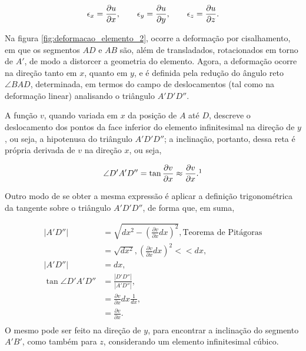 \begin{equation}
    \epsilon_x = \frac{\partial u}{\partial x}, \qquad \epsilon_y = \frac{\partial u}{\partial y}, \qquad \epsilon_z = \frac{\partial u}{\partial z}. \\
\end{equation}  

Na figura \ref{fig:deformacao_elemento_2}, ocorre a deformação por cisalhamento, em que os segmentos $AD$ e $AB$ são, além de transladados, rotacionados em torno de $A'$, de modo a distorcer a geometria do elemento. Agora, a deformação ocorre na direção tanto em $x$, quanto em $y$, e é definida pela redução do ângulo reto $\angle BAD$, determinada, em termos do campo de deslocamentos (tal como na deformação linear) analisando o triângulo $A'D'D''$.

A função $v$, quando variada em $x$ da posição de $A$ até $D$, descreve o deslocamento dos pontos da face inferior do elemento infinitesimal na direção de $y$, ou seja, a hipotenusa do triângulo $A'D'D''$; a inclinação, portanto, dessa reta é própria derivada de $v$ na direção $x$, ou seja,

\begin{equation}
    \angle D'A'D'' = \tan{\frac{\partial v}{\partial x}} \approx \frac{\partial v}{\partial x}.\footnotemark
\end{equation}

Outro modo de se obter a mesma expressão é aplicar a definição trigonométrica da tangente sobre o triângulo $A'D'D''$, de forma que, em suma,

\begin{align}
    |A'D''|             &= \sqrt{dx^2 -  \left(\frac{\partial v}{\partial x}dx\right)^2}, \text{Teorema de Pitágoras}\\
                         &= \sqrt{dx^2}, \left(\frac{\partial v}{\partial x}dx\right)^2 << dx,\\
    |A'D''|              &= dx,\\
    \tan{\angle D'A'D''} &= \frac{|D'D''|}{|A'D''|}, \\
                         &= \frac{\partial v}{\partial x}dx \frac{1}{dx},\\
                         & = \frac{\partial v}{\partial x}.\\
\end{align}
O mesmo pode ser feito na direção de $y$, para encontrar a inclinação do segmento $A'B'$, como também para $z$, considerando um elemento infinitesimal cúbico.

